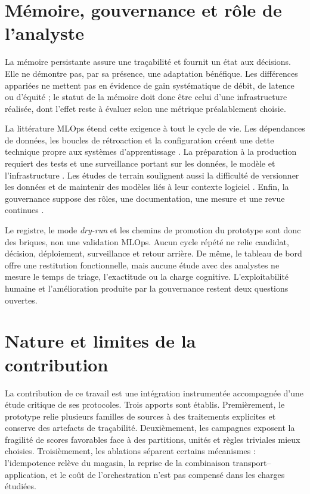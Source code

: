 \section{Mémoire, gouvernance et rôle de l'analyste}

La mémoire persistante assure une traçabilité et fournit un état aux décisions. Elle ne
démontre pas, par sa présence, une adaptation bénéfique. Les différences appariées ne
mettent pas en évidence de gain systématique de débit, de latence ou d'équité ; le statut
de la mémoire doit donc être celui d'une infrastructure réalisée, dont l'effet reste à
évaluer selon une métrique préalablement choisie.

La littérature MLOps étend cette exigence à tout le cycle de vie. Les dépendances de
données, les boucles de rétroaction et la configuration créent une dette technique propre
aux systèmes d'apprentissage \cite{sculley2015debt}. La préparation à la production
requiert des tests et une surveillance portant sur les données, le modèle et
l'infrastructure \cite{breck2017mltest}. Les études de terrain soulignent aussi la
difficulté de versionner les données et de maintenir des modèles liés à leur contexte
logiciel \cite{amershi2019software}. Enfin, la gouvernance suppose des rôles, une
documentation, une mesure et une revue continues \cite{nist2023airmf}.

Le registre, le mode \textit{dry-run} et les chemins de promotion du prototype sont donc
des briques, non une validation MLOps. Aucun cycle répété ne relie candidat, décision,
déploiement, surveillance et retour arrière. De même, le tableau de bord offre une
restitution fonctionnelle, mais aucune étude avec des analystes ne mesure le temps de
triage, l'exactitude ou la charge cognitive. L'exploitabilité humaine et l'amélioration
produite par la gouvernance restent deux questions ouvertes.

\section{Nature et limites de la contribution}

La contribution de ce travail est une intégration instrumentée accompagnée d'une étude
critique de ses protocoles. Trois apports sont établis. Premièrement, le prototype relie
plusieurs familles de sources à des traitements explicites et conserve des artefacts de
traçabilité. Deuxièmement, les campagnes exposent la fragilité de scores favorables face
à des partitions, unités et règles triviales mieux choisies. Troisièmement, les ablations
séparent certains mécanismes : l'idempotence relève du magasin, la reprise de la
combinaison transport--application, et le coût de l'orchestration n'est pas compensé dans
les charges étudiées.

